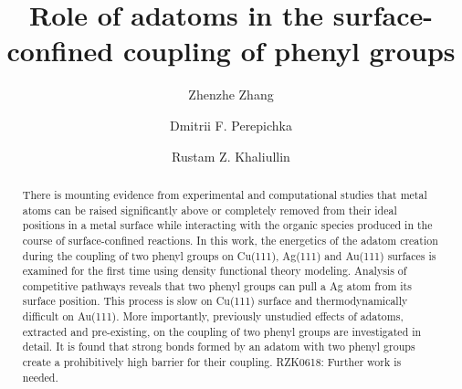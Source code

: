 \documentclass[%
 reprint,
 amsmath,amssymb,
 aps,
prb,
floatfix,
]{revtex4-2}
\newcommand{\comm}{\color{ForestGreen}} %
\begin{document}
\title{Role of adatoms in the surface-confined coupling of phenyl groups}

\author{Zhenzhe Zhang}
\author{Dmitrii F. Perepichka}%
\author{Rustam Z. Khaliullin}
%


\begin{abstract}
There is mounting evidence from experimental and computational studies that metal atoms can be raised significantly above or completely removed from their ideal positions in a metal surface while interacting with the organic species produced in the course of surface-confined reactions. In this work, the energetics of the adatom creation during the coupling of two phenyl groups on Cu(111), Ag(111) and Au(111) surfaces is examined for the first time using density functional theory modeling. Analysis of competitive pathways reveals that two phenyl groups can pull a Ag atom from its surface position. This process is slow on Cu(111) surface and thermodynamically difficult on Au(111).  More importantly, previously unstudied effects of adatoms, extracted and pre-existing, on the coupling of two phenyl groups are investigated in detail. It is found that strong bonds formed by an adatom with two phenyl groups create a prohibitively high barrier for their coupling.
{\comm RZK0618: Further work is needed.}
\end{abstract}

\maketitle




\end{document}
